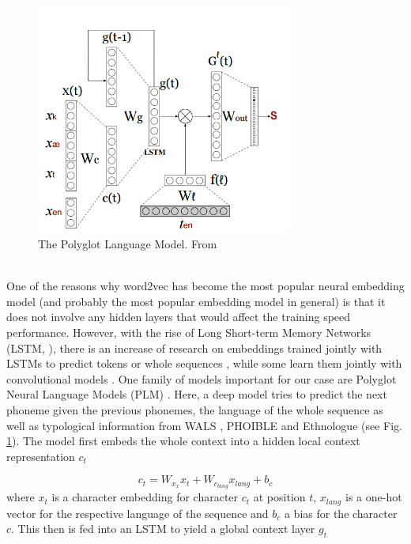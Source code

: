 \documentclass[11pt]{article}
\begin{document}
\begin{figure}[htbp] %
   \centering
   \includegraphics[width=0.75\textwidth]{polyglotLM} 
   \caption{The Polyglot Language Model. From \cite{tsvetkov2016polyglot}}
   \label{fig:plm}
\end{figure}

\\
One of the reasons why word2vec has become the most popular neural embedding model (and probably the most popular embedding model in general) is that it does not involve any hidden layers that would affect the training speed performance. However, with the rise of Long Short-term Memory Networks (LSTM, \cite{hochreiter1997long}), there is an increase of research on embeddings trained jointly with LSTMs to predict tokens or whole sequences \cite{chen2015joint,ling2015finding,kim2015character,dos2014learning}, while some learn them jointly with convolutional models \cite{zhang2015character}. One family of models important for our case are Polyglot Neural Language Models (PLM) \cite{tsvetkov2016polyglot}. Here, a deep model tries to predict the next phoneme given the previous phonemes, the language of the whole sequence as well as typological information from WALS \cite{wals}, PHOIBLE \cite{phoible} and Ethnologue \cite{lewis2015ethnologue} (see Fig. \ref{fig:plm}). 
The model first embeds the whole context into a hidden local context representation $c_t$

\begin{equation}
c_t = W_{x_{x}}x_t + W_{c_{lang}}x_{lang}+b_c
\label{eq:plm_1}
\end{equation}
where $x_t$ is a character embedding for character $c_t$ at position $t$, $x_{lang}$ is a one-hot vector for the respective language of the sequence and $b_c$ a bias for the character $c$. This then is fed into an LSTM to yield a global context layer $g_t$
\end{document}
